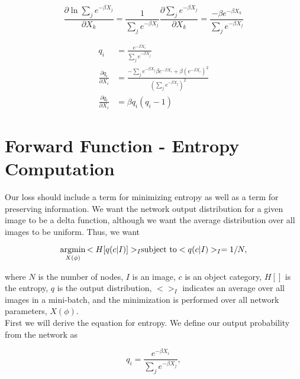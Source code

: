 \begin{equation}
    \frac{\partial \ln{\sum_{j} e^{-\beta X_{j}}}}{\partial X_{k}} = \frac{1}{\sum_{j} e^{-\beta X_{j}}} \frac{\partial \sum_{j} e^{-\beta X_{j}}}{\partial X_{k}} = \frac{-\beta e^{-\beta X_{k}}}{\sum_{j}e^{-\beta X_{j}}}
\label{dlne}
\end{equation}

\begin{equation}
\begin{aligned}
    q_i &= \frac{e^{-\beta X_{i}}}{\sum_{j} e^{-\beta X_{j}}}\\
    \frac{\partial q_{i}}{\partial X_{i}} &= \frac{-\sum_{j} e^{-\beta X_{j}} \beta e^{-\beta X_{i}} + \beta (e^{-\beta X_{i}})^2} {(\sum_{j}e^{-\beta X_{j}})^2}\\
    \frac{\partial q_{i}}{\partial X_{i}} &= \beta q_{i} \left(q_{i} - 1\right)
\label{qderiv}
\end{aligned}
\end{equation}

\section{Forward Function - Entropy Computation} \label{forward}
\noindent Our loss should include a term for minimizing entropy as well as a term for preserving information. We want the network output distribution for a given image to be a delta function, although we want the average distribution over all images to be uniform. Thus, we want 

\begin{displaymath}
\argmin_{X(\phi)}{<H[q(c|I)]>_{I}} \\
\text{subject to} <q(c|I)>_{I} = 1/N,
\end{displaymath}

\noindent where $N$ is the number of nodes, $I$ is an image, $c$ is an object category, $H[]$ is the entropy, $q$ is the output distribution, $<>_{I}$ indicates an average over all images in a mini-batch, and the minimization is performed over all network parameters, $X(\phi)$.\\

\noindent First we will derive the equation for entropy. We define our output probability from the network as

\begin{equation}
    q_{i} = \frac{e^{-\beta X_{i}}}{\sum_{j} e^{-\beta X_{j}}},
\label{qdef}
\end{equation}

